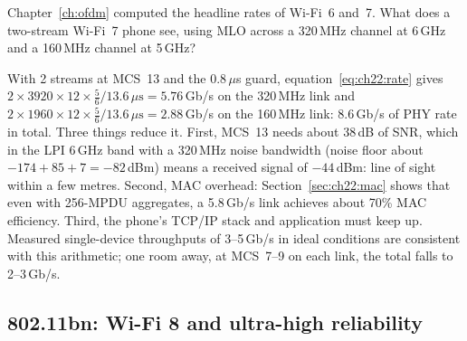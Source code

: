 \begin{worked}
Chapter~\ref{ch:ofdm} computed the headline rates of Wi-Fi~6 and~7. What does a two-stream Wi-Fi~7
phone see, using MLO across a 320\,MHz channel at 6\,GHz and a 160\,MHz channel at 5\,GHz?

With 2 streams at MCS~13 and the 0.8\,$\mu$s guard, equation~\eqref{eq:ch22:rate} gives
$2\times3920\times12\times\tfrac56/13.6\,\mu\text{s}=5.76$\,Gb/s on the 320\,MHz link and
$2\times1960\times12\times\tfrac56/13.6\,\mu\text{s}=2.88$\,Gb/s on the 160\,MHz link: 8.6\,Gb/s of PHY
rate in total. Three things reduce it. First, MCS~13 needs about 38\,dB of SNR, which in the LPI
6\,GHz band with a 320\,MHz noise bandwidth (noise floor about $-174+85+7=-82$\,dBm) means a received
signal of $-44$\,dBm: line of sight within a few metres. Second, MAC overhead:
Section~\ref{sec:ch22:mac} shows that even with 256-MPDU aggregates, a 5.8\,Gb/s link achieves about
70\% MAC efficiency. Third, the phone's TCP/IP stack and application must keep up. Measured
single-device throughputs of 3--5\,Gb/s in ideal conditions are consistent with this arithmetic; one
room away, at MCS~7--9 on each link, the total falls to 2--3\,Gb/s.
\end{worked}

\subsection{802.11bn: Wi-Fi 8 and ultra-high reliability}

